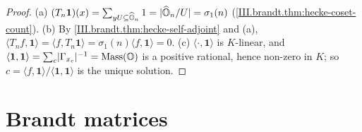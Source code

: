 \begin{theorem}
\end{theorem}
\begin{proof}
(a) $(T_n\mathbf 1)(x)=\sum_{yU\subseteq\widehat{\mathbb{O}}_n}1=\lvert\widehat{\mathbb{O}}_n/U\rvert=\sigma_1(n)$ (\cref{III.brandt.thm:hecke-coset-count}). (b) By
\cref{III.brandt.thm:hecke-self-adjoint} and (a), $\langle T_nf,\mathbf 1\rangle=\langle f,T_n\mathbf 1\rangle=\sigma_1(n)\langle f,\mathbf 1\rangle=0$. (c) $\langle\cdot,\mathbf 1\rangle$ is
$K$-linear, and $\langle\mathbf 1,\mathbf 1\rangle=\sum_c\lvert\Gamma_{x_c}\rvert^{-1}=\operatorname{Mass}(\mathbb{O})$ is a positive rational, hence non-zero in $K$; so
$c=\langle f,\mathbf 1\rangle/\langle\mathbf 1,\mathbf 1\rangle$ is the unique solution.
\end{proof}

\section{Brandt matrices}\label{sec:brandt-brandt}

